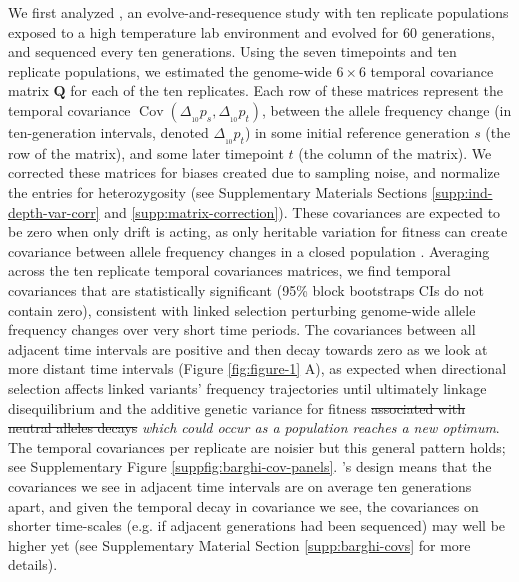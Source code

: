 \documentclass[11pt]{article}
\newcommand{\vb}[1]{{\it \color{blue} #1}}
\DeclareMathOperator{\cov}{Cov}
\providecommand{\DIFaddtex}[1]{{\protect\color{blue}\uwave{#1}}} %
\providecommand{\DIFdeltex}[1]{{\protect\color{red}\sout{#1}}}                      %
\providecommand{\DIFaddbegin}{} %
\providecommand{\DIFaddend}{} %
\providecommand{\DIFdelbegin}{} %
\providecommand{\DIFdelend}{} %
\providecommand{\DIFadd}[1]{\texorpdfstring{\DIFaddtex{#1}}{#1}} %
\providecommand{\DIFdel}[1]{\texorpdfstring{\DIFdeltex{#1}}{}} %
\begin{document}
We first analyzed \textcite{Barghi2019-qy}, an evolve-and-resequence study with
ten replicate populations exposed to a high temperature lab environment and
evolved for 60 generations, and sequenced every ten generations. Using the
seven timepoints and ten replicate populations, we estimated the genome-wide $6
\times 6$ temporal covariance matrix $\mathbf{Q}$ for each of the ten
replicates. Each row of these matrices represent the temporal covariance
$\cov(\Delta_{_{10}} p_s, \Delta_{_{10}} p_t)$, between the allele frequency
change (in ten-generation intervals, denoted $\Delta_{_{10}} p_t$) in some
initial reference generation $s$ (the row of the matrix), and some later
timepoint $t$ (the column of the matrix). We corrected these matrices for
biases created due to sampling noise, and normalize the entries for
heterozygosity (see Supplementary Materials Sections
\ref{supp:ind-depth-var-corr} and \ref{supp:matrix-correction}). These
covariances are expected to be zero when only drift is acting, as only
heritable variation for fitness can create covariance between allele frequency
changes in a closed population \parencite{Buffalo2019-io}.  Averaging across
the ten replicate temporal covariances matrices, we find temporal covariances
that are statistically significant (95\% block bootstraps CIs do not contain
zero), consistent with linked selection perturbing genome-wide allele frequency
changes over very short time periods. The covariances between all adjacent time
intervals are positive and then decay towards zero as we look at more distant
time intervals (Figure \ref{fig:figure-1} A), as expected when directional
selection affects linked variants' frequency trajectories until ultimately
linkage disequilibrium and the \DIFaddbegin \DIFadd{associated }\DIFaddend additive genetic variance for fitness
\DIFdelbegin \DIFdel{associated
with neutral alleles decays }\DIFdelend \DIFaddbegin \DIFadd{decays (}\vb{which could occur as a population reaches a new optimum}\DIFadd{)
}\DIFaddend \parencite{Buffalo2019-io}. The temporal covariances per replicate are noisier
but this general pattern holds; see Supplementary Figure
\ref{suppfig:barghi-cov-panels}.  \textcite{Barghi2019-qy}'s design means that
the covariances we see in adjacent time intervals are on average ten
generations apart, and given the temporal decay in covariance we see, the
covariances on shorter time-scales (e.g. if adjacent generations had been
sequenced) may well be higher yet (see Supplementary Material Section
\ref{supp:barghi-covs} for more details).
\end{document}
